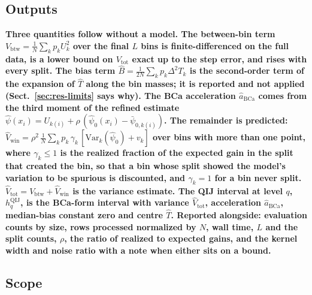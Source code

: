 \documentclass[runningheads]{llncs}
\newif\ifrev \revtrue
\newcommand{\rev}[1]{\ifrev{\color{blue}\bfseries #1}\else#1\fi}
\newcommand{\Vcell}{V_{\mathrm{btw}}}
\newcommand{\Vtotal}{V_{\mathrm{tot}}}
\newcommand{\Vwinhat}{\hat V_{\mathrm{win}}}
\newcommand{\Vtothat}{\hat V_{\mathrm{tot}}}
\newcommand{\psinull}{\hat{\psi}_0}
\newcommand{\psih}{\hat{\psi}}
\newcommand{\Bhat}{\hat{B}}
\newcommand{\hqij}[1]{h^{\mathrm{QIJ}}_{#1}}
\begin{document}
\subsection{Outputs}\label{sec:outputs}

\rev{Three quantities follow without a model. The between-bin term $\Vcell = \frac1N\sum_k p_k U_k^2$ over the final $L$ bins is finite-differenced on the full data, is a lower bound on $\Vtotal$ exact up to the step error, and rises with every split. The bias term $\Bhat = \frac{1}{2N}\sum_k p_k \Delta^2 T_k$ is the second-order term of the expansion of $\hat T$ along the bin masses; it is reported and not applied (Sect.~\ref{sec:res-limits} says why). The BCa acceleration $\hat a_{\mathrm{BCa}}$ comes from the third moment of the refined estimate $\psih(x_i) = U_{k(i)} + \rho\,(\psinull(x_i) - \bar\psi_{0,k(i)})$. The remainder is predicted: $\Vwinhat = \rho^2\,\frac1N\sum_k p_k\,\gamma_k\,[\mathrm{Var}_k(\psinull) + v_k]$ over bins with more than one point, where $\gamma_k \le 1$ is the realized fraction of the expected gain in the split that created the bin, so that a bin whose split showed the model's variation to be spurious is discounted, and $\gamma_k = 1$ for a bin never split. $\Vtothat = \Vcell + \Vwinhat$ is the variance estimate. The QIJ interval at level $q$, $\hqij{q}$, is the BCa-form interval with variance $\Vtothat$, acceleration $\hat a_{\mathrm{BCa}}$, median-bias constant zero and centre $\hat T$. Reported alongside: evaluation counts by size, rows processed normalized by $N$, wall time, $L$ and the split counts, $\rho$, the ratio of realized to expected gains, and the kernel width and noise ratio with a note when either sits on a bound.}

\subsection{Scope}\label{sec:scope}
\end{document}
